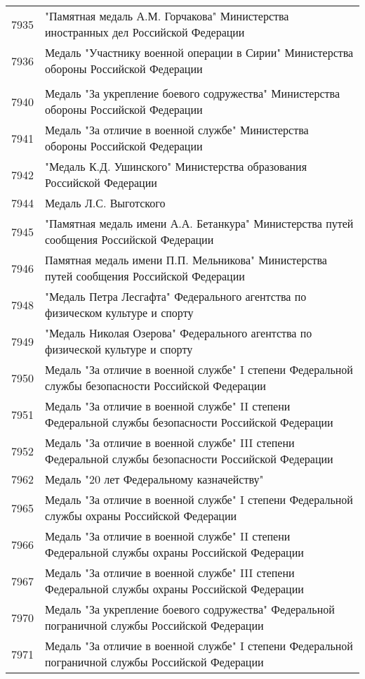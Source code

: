 \documentclass[10pt, a4paper, titlepage]{article}
\begin{document}
\begin{center}
\begin{longtable}{rp{}}
        7935 & "Памятная медаль А.М. Горчакова" Министерства иностранных дел Российской Федерации \\
        7936 & Медаль "Участнику военной операции в Сирии" Министерства обороны Российской Федерации \\ \\
        7940 & Медаль "За укрепление боевого содружества" Министерства обороны Российской Федерации \\
        7941 & Медаль "За отличие в военной службе" Министерства обороны Российской Федерации \\
        7942 & "Медаль К.Д. Ушинского" Министерства образования Российской Федерации \\
        7944 & Медаль Л.С. Выготского \\
        7945 & "Памятная медаль имени А.А. Бетанкура" Министерства путей сообщения Российской Федерации \\
        7946 & Памятная медаль имени П.П. Мельникова" Министерства путей сообщения Российской Федерации \\
        7948 & "Медаль Петра Лесгафта" Федерального агентства по физическом культуре и спорту \\
        7949 & "Медаль Николая Озерова" Федерального агентства по физической культуре и спорту \\
        7950 & Медаль "За отличие в военной службе" I степени Федеральной службы безопасности Российской Федерации \\
        7951 & Медаль "За отличие в военной службе" II степени Федеральной службы безопасности Российской Федерации \\
        7952 & Медаль "За отличие в военной службе" III степени Федеральной службы безопасности Российской Федерации \\
        7962 & Медаль "20 лет Федеральному казначейству" \\
        7965 & Медаль "За отличие в военной службе" I степени Федеральной службы охраны Российской Федерации \\
        7966 & Медаль "За отличие в военной службе" II степени Федеральной службы охраны Российской Федерации \\
        7967 & Медаль "За отличие в военной службе" III степени Федеральной службы охраны Российской Федерации \\
        7970 & Медаль "За укрепление боевого содружества" Федеральной пограничной службы Российской Федерации \\
        7971 & Медаль "За отличие в военной службе" I степени Федеральной пограничной службы Российской Федерации \\

\end{longtable}
\end{center}
\end{document}
